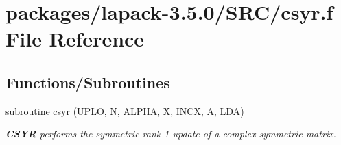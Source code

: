 \hypertarget{csyr_8f}{}\section{packages/lapack-\/3.5.0/\+S\+R\+C/csyr.f File Reference}
\label{csyr_8f}
\subsection*{Functions/\+Subroutines}
\begin{DoxyCompactItemize}
\item 
subroutine \hyperlink{group__complexSYauxiliary_gab7fbaf7c4477110907f682b250b24abe}{csyr} (U\+P\+L\+O, \hyperlink{polmisc_8c_a0240ac851181b84ac374872dc5434ee4}{N}, A\+L\+P\+H\+A, X, I\+N\+C\+X, \hyperlink{classA}{A}, \hyperlink{example__user_8c_ae946da542ce0db94dced19b2ecefd1aa}{L\+D\+A})
\begin{DoxyCompactList}\small\item\em {\bfseries C\+S\+Y\+R} performs the symmetric rank-\/1 update of a complex symmetric matrix. \end{DoxyCompactList}\end{DoxyCompactItemize}
